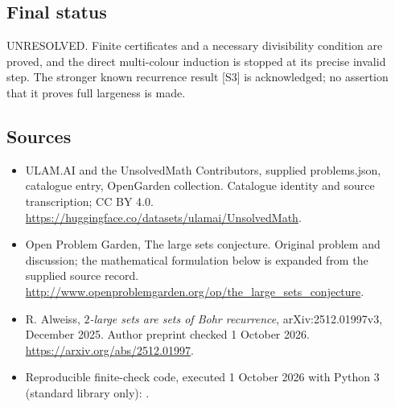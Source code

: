 \documentclass[11pt,a4paper]{article}
\begin{document}
\subsection{Final status}
UNRESOLVED. Finite certificates and a necessary divisibility condition
are proved, and the direct multi-colour induction is stopped at its
precise invalid step. The stronger known recurrence result [S3] is
acknowledged; no assertion that it proves full largeness is made.

\subsection{Sources}
\begin{itemize}
\item[S1] ULAM.AI and the UnsolvedMath Contributors, supplied problems.json, catalogue entry, OpenGarden collection. Catalogue identity and source transcription; CC BY 4.0.
\url{https://huggingface.co/datasets/ulamai/UnsolvedMath}.
\item[S2] Open Problem Garden, The large sets conjecture. Original problem and discussion; the mathematical formulation below is expanded from the supplied source record.
\url{http://www.openproblemgarden.org/op/the_large_sets_conjecture}.
\item[S3] R. Alweiss, \emph{$2$-large sets are sets of Bohr recurrence}, arXiv:2512.01997v3, December 2025. Author preprint checked 1 October 2026.
\url{https://arxiv.org/abs/2512.01997}.
\item[C1] Reproducible finite-check code, executed 1 October 2026 with Python 3 (standard library only):
.
\end{itemize}
\end{document}
